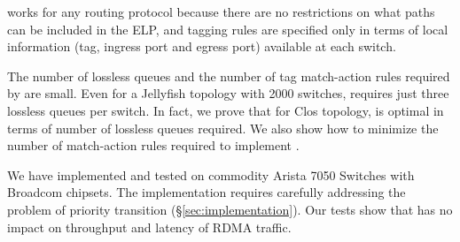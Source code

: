 \sysname{} works for any routing protocol because there are no restrictions on what
paths can be included in the ELP, and tagging rules are specified only in terms
of local information (tag, ingress port and egress port) available at each
switch.

The number of lossless queues and the number of tag match-action rules required
by \sysname{} are small.  Even for a Jellyfish topology with 2000 switches,
\sysname{} requires just three lossless queues per switch.  In fact, we prove
that for Clos topology,  \sysname{} is optimal in terms of number of lossless
queues required.  We also show how to minimize the number of match-action rules
required to implement \sysname{}.

We have implemented and tested \sysname{} on commodity Arista 7050 Switches with
Broadcom chipsets. The implementation requires carefully addressing the problem
of priority transition (\S\ref{sec:implementation}). Our tests show that
\sysname{} has no impact on throughput and latency of RDMA traffic.

